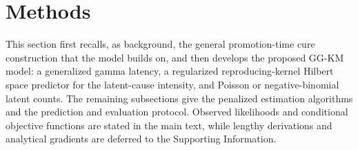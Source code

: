 \section{Methods}\label{sec:methods}

This section first recalls, as background, the general promotion-time cure construction that the model builds on, and then develops the proposed GG-KM model: a generalized gamma latency, a regularized reproducing-kernel Hilbert space predictor for the latent-cause intensity, and Poisson or negative-binomial latent counts. The remaining subsections give the penalized estimation algorithms and the prediction and evaluation protocol. Observed likelihoods and conditional objective functions are stated in the main text, while lengthy derivations and analytical gradients are deferred to the Supporting Information.



